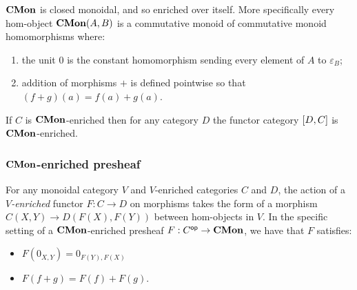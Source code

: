 $\mathbf{CMon}$ is closed monoidal, and so enriched over itself. More specifically every hom-object $\mathbf{CMon}(A,B)$ is a
commutative monoid of commutative monoid homomorphisms where:

\begin{enumerate}
\item the unit $0$ is the constant homomorphism sending every element of $A$ to $\varepsilon_B$;
\item addition of morphisms $+$ is defined pointwise so that $(f + g)(a) = f(a) + g(a)$.
\end{enumerate}

\begin{proposition}
If $C$ is $\mathbf{CMon}$-enriched then for any category $D$ the functor category $[D,C]$ is $\mathbf{CMon}$-enriched.
\end{proposition}

\subsubsection{$\mathbf{CMon}$-enriched presheaf}

For any monoidal category $V$ and $V$-enriched categories $C$ and $D$, the action of a \emph{$V$-enriched}
functor $F: C \to D$ on morphisms takes the form of a morphism $C(X,Y) \to D(F(X),F(Y))$ between hom-objects
in $V$. In the specific setting of a $\mathbf{CMon}$-enriched presheaf $F: C^{\mathsf{op}} \to \mathbf{CMon}$, we have that $F$
satisfies:
\begin{itemize}
\item $F(0_{X,Y}) = 0_{F(Y),F(X)}$
\item $F(f + g) = F(f) + F(g)$.
\end{itemize}
